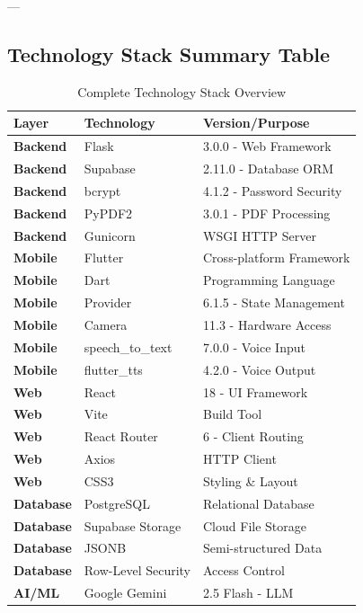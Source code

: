 ---

\subsection{Technology Stack Summary Table}

\begin{table}[H]
\centering
\caption{Complete Technology Stack Overview}
\begin{tabularx}{\textwidth}{|l|l|X|}
\hline
\textbf{Layer} & \textbf{Technology} & \textbf{Version/Purpose} \\
\hline
\textbf{Backend} & Flask & 3.0.0 - Web Framework \\
\hline
\textbf{Backend} & Supabase & 2.11.0 - Database ORM \\
\hline
\textbf{Backend} & bcrypt & 4.1.2 - Password Security \\
\hline
\textbf{Backend} & PyPDF2 & 3.0.1 - PDF Processing \\
\hline
\textbf{Backend} & Gunicorn & WSGI HTTP Server \\
\hline
\textbf{Mobile} & Flutter & Cross-platform Framework \\
\hline
\textbf{Mobile} & Dart & Programming Language \\
\hline
\textbf{Mobile} & Provider & 6.1.5 - State Management \\
\hline
\textbf{Mobile} & Camera & 11.3 - Hardware Access \\
\hline
\textbf{Mobile} & speech\_to\_text & 7.0.0 - Voice Input \\
\hline
\textbf{Mobile} & flutter\_tts & 4.2.0 - Voice Output \\
\hline
\textbf{Web} & React & 18 - UI Framework \\
\hline
\textbf{Web} & Vite & Build Tool \\
\hline
\textbf{Web} & React Router & 6 - Client Routing \\
\hline
\textbf{Web} & Axios & HTTP Client \\
\hline
\textbf{Web} & CSS3 & Styling \& Layout \\
\hline
\textbf{Database} & PostgreSQL & Relational Database \\
\hline
\textbf{Database} & Supabase Storage & Cloud File Storage \\
\hline
\textbf{Database} & JSONB & Semi-structured Data \\
\hline
\textbf{Database} & Row-Level Security & Access Control \\
\hline
\textbf{AI/ML} & Google Gemini & 2.5 Flash - LLM \\

\end{tabularx}
\end{table}
